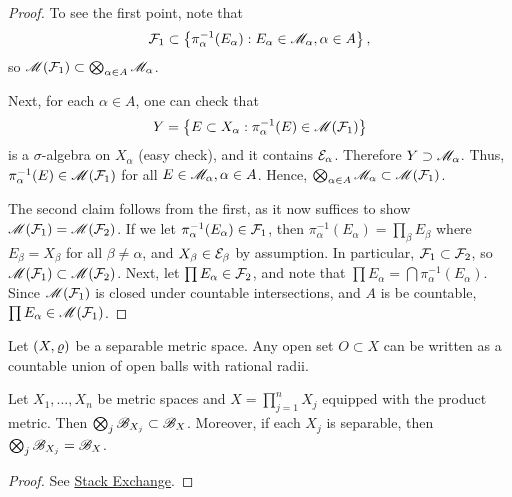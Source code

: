 \documentclass[12pt]{article} %
\begin{document}
\begin{proof}
    To see the first point, note that \[\mathcal{F}_1 \subset \left\{ \pi_{\alpha}^{-1}(E_\alpha) : E_\alpha \in \mathscr{M}_\alpha, \alpha \in A\right\},\] so $\mathscr{M}(\mathcal{F}_1) \subset \bigotimes_{\alpha \in A} \mathscr{M}_\alpha$.

    Next, for each $\alpha \in A$, one can check that \[Y = \left\{ E \subset X_\alpha : \pi_{\alpha}^{-1}(E) \in \mathscr{M}(\mathcal{F}_1) \right\}\] is a $\sigma$-algebra on $X_\alpha$ (easy check), and it contains $\mathcal{E}_\alpha$. Therefore $Y \supset \mathscr{M}_\alpha$. Thus, $\pi_{\alpha}^{-1}(E) \in \mathscr{M}(\mathcal{F}_1)$ for all $E \in \mathscr{M}_\alpha, \alpha \in A$. Hence, $\bigotimes_{\alpha \in A} \mathscr{M}_\alpha \subset \mathscr{M}(\mathcal{F}_1)$. 
    
    The second claim follows from the first, as it now suffices to show $\mathscr{M}(\mathcal{F}_1) = \mathscr{M}(\mathcal{F}_2)$. If we let $\pi_{\alpha}^{-1}(E_\alpha) \in \mathcal{F}_1$, then $\pi_{\alpha}^{-1}(E_\alpha) = \prod_{\beta}E_\beta$ where $E_\beta = X_\beta$ for all $\beta \neq \alpha$, and $X_\beta \in \mathcal{E}_\beta$ by assumption. In particular, $\mathcal{F}_1 \subset \mathcal{F}_2$, so $\mathscr{M}(\mathcal{F}_1) \subset \mathscr{M}(\mathcal{F}_2)$. Next, let $\prod E_\alpha \in \mathcal{F}_2$, and note that $\prod E_\alpha = \bigcap \pi_{\alpha}^{-1}(E_\alpha)$. Since $\mathscr{M}(\mathcal{F}_1)$ is closed under countable intersections, and $A$ is be countable, $\prod E_\alpha \in \mathscr{M}(\mathcal{F}_1)$.
\end{proof}

\begin{lemma}
    Let $(X, \varrho)$ be a separable metric space. Any open set $O \subset X$ can be written as a countable union of open balls with rational radii.
\end{lemma}

\begin{proposition}
    Let $X_1, \ldots, X_n$ be metric spaces and $X = \prod_{j=1}^{n} X_j$ equipped with the product metric. Then $\bigotimes_{j} \mathscr{B}_{X_j} \subset \mathscr{B}_X$. Moreover, if each $X_j$ is separable, then $\bigotimes_{j} \mathscr{B}_{X_j} = \mathscr{B}_X$.
\end{proposition}

\begin{proof}
    See \href{https://math.stackexchange.com/questions/1943686/in-separable-metric-space-every-open-set-is-at-most-countable-union-of-open-ball}{Stack Exchange}.
\end{proof}
\end{document}
